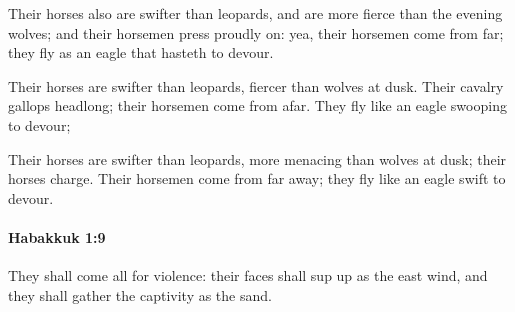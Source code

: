 			\begin{versebox}
					\item[BHS] 
					\item[LXX] 
					\item[ASV] Their horses also are swifter than leopards, and are more fierce than the evening wolves; and their horsemen press proudly on: yea, their horsemen come from far; they fly as an eagle that hasteth to devour.
					\item[NIV] Their horses are swifter than leopards, fiercer than wolves at dusk. Their cavalry gallops headlong; their horsemen come from afar. They fly like an eagle swooping to devour;
					\item[NRSV] Their horses are swifter than leopards, more menacing than wolves at dusk; their horses charge. Their horsemen come from far away; they fly like an eagle swift to devour.
			\end{versebox}

		\paragraph{Habakkuk 1:9} %
			\label{HABAKKUK-1-9}

			They shall come all for violence: their faces shall sup up as the east wind, and they shall gather the captivity as the sand.

